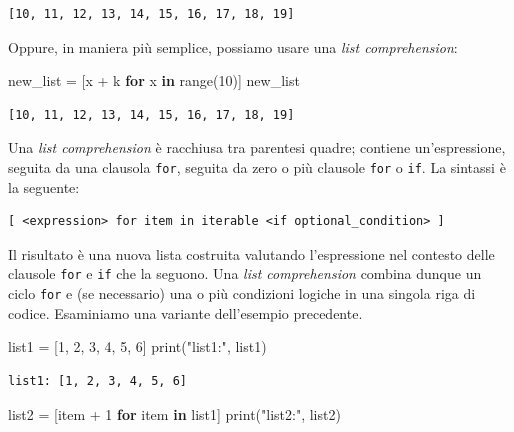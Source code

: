 \documentclass[
  letterpaper,
  krantz2]{{[}./krantz{]}}
\newenvironment{Shaded}{\begin{snugshade}}{\end{snugshade}}
\newcommand{\BuiltInTok}[1]{\textcolor[rgb]{0.00,0.23,0.31}{#1}}
\newcommand{\ControlFlowTok}[1]{\textcolor[rgb]{0.00,0.23,0.31}{\textbf{#1}}}
\newcommand{\DecValTok}[1]{\textcolor[rgb]{0.68,0.00,0.00}{#1}}
\newcommand{\KeywordTok}[1]{\textcolor[rgb]{0.00,0.23,0.31}{\textbf{#1}}}
\newcommand{\NormalTok}[1]{\textcolor[rgb]{0.00,0.23,0.31}{#1}}
\newcommand{\OperatorTok}[1]{\textcolor[rgb]{0.37,0.37,0.37}{#1}}
\newcommand{\StringTok}[1]{\textcolor[rgb]{0.13,0.47,0.30}{#1}}
\begin{document}
\begin{verbatim}
[10, 11, 12, 13, 14, 15, 16, 17, 18, 19]
\end{verbatim}

Oppure, in maniera più semplice, possiamo usare una \emph{list
comprehension}:

\begin{Shaded}
\begin{Highlighting}[]
\NormalTok{new\_list }\OperatorTok{=}\NormalTok{ [x }\OperatorTok{+}\NormalTok{ k }\ControlFlowTok{for}\NormalTok{ x }\KeywordTok{in} \BuiltInTok{range}\NormalTok{(}\DecValTok{10}\NormalTok{)]}
\NormalTok{new\_list}
\end{Highlighting}
\end{Shaded}

\begin{verbatim}
[10, 11, 12, 13, 14, 15, 16, 17, 18, 19]
\end{verbatim}

Una \emph{list comprehension} è racchiusa tra parentesi quadre; contiene
un'espressione, seguita da una clausola \texttt{for}, seguita da zero o
più clausole \texttt{for} o \texttt{if}. La sintassi è la seguente:

\begin{verbatim}
[ <expression> for item in iterable <if optional_condition> ]
\end{verbatim}

Il risultato è una nuova lista costruita valutando l'espressione nel
contesto delle clausole \texttt{for} e \texttt{if} che la seguono. Una
\emph{list comprehension} combina dunque un ciclo \texttt{for} e (se
necessario) una o più condizioni logiche in una singola riga di codice.
Esaminiamo una variante dell'esempio precedente.

\begin{Shaded}
\begin{Highlighting}[]
\NormalTok{list1 }\OperatorTok{=}\NormalTok{ [}\DecValTok{1}\NormalTok{, }\DecValTok{2}\NormalTok{, }\DecValTok{3}\NormalTok{, }\DecValTok{4}\NormalTok{, }\DecValTok{5}\NormalTok{, }\DecValTok{6}\NormalTok{]}
\BuiltInTok{print}\NormalTok{(}\StringTok{"list1:"}\NormalTok{, list1)}
\end{Highlighting}
\end{Shaded}

\begin{verbatim}
list1: [1, 2, 3, 4, 5, 6]
\end{verbatim}

\begin{Shaded}
\begin{Highlighting}[]
\NormalTok{list2 }\OperatorTok{=}\NormalTok{ [item }\OperatorTok{+} \DecValTok{1} \ControlFlowTok{for}\NormalTok{ item }\KeywordTok{in}\NormalTok{ list1]}
\BuiltInTok{print}\NormalTok{(}\StringTok{"list2:"}\NormalTok{, list2)}
\end{Highlighting}
\end{Shaded}
\end{document}
